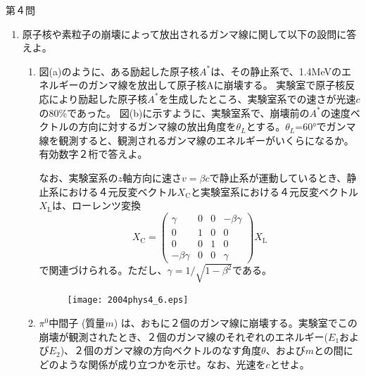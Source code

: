 \documentclass[fleqn]{jbook}
\begin{document}
\begin{question}{第４問}{}
\begin{enumerate}
\begin{enumerate}
\begin{figure}[htbp]
\begin{center}
\texttt{[image: 2004phys4\_5.eps]}
\caption{}
\end{center}
\end{figure}

\end{enumerate}

\item
原子核や素粒子の崩壊によって放出されるガンマ線に関して以下の設問に答えよ。

\begin{enumerate}
\item
図(a)のように、ある励起した原子核$A^{*}$は、その静止系で、1.4MeVのエネルギーのガンマ線を放出して原子核Aに崩壊する。
実験室で原子核反応により励起した原子核$A^{*}$を生成したところ、実験室系での速さが光速$c$の80\%であった。
図(b)に示すように、実験室系で、崩壊前の$A^{*}$の速度ベクトルの方向に対するガンマ線の放出角度を$\theta_L$とする。$\theta_L$=60°でガンマ線を観測すると、観測されるガンマ線のエネルギーがいくらになるか。有効数字２桁で答えよ。

なお、実験室系の$z$軸方向に速さ$v=\beta c$で静止系が運動しているとき、静止系における４元反変ベクトル$X_\mathrm{C}$と実験室系における４元反変ベクトル$X_\mathrm{L}$は、ローレンツ変換
$$
X_\mathrm{C}=
\left(
\begin{array}{cccc}
\gamma&  0 &0 &-\beta\gamma\\
0&1&0&0\\
0&0&1&0\\
-\beta\gamma &0&0&\gamma
\end{array}
\right)
X_\mathrm{L}
$$
で関連づけられる。ただし、$\gamma=1/\sqrt{1-\beta^2}$である。

\begin{figure}[htbp]
\begin{center}
\texttt{[image: 2004phys4\_6.eps]}
\caption{}
\end{center}
\end{figure}

\item $\pi^0$中間子 (質量$m$) は、おもに２個のガンマ線に崩壊する。実験室でこの崩壊が観測されたとき、２個のガンマ線のそれぞれのエネルギー($E_1$および$E_2$)、２個のガンマ線の方向ベクトルのなす角度$\theta$、および$m$との間にどのような関係が成り立つかを示せ。なお、光速を$c$とせよ。
\end{enumerate}

\end{enumerate}
\end{question}
\end{document}
